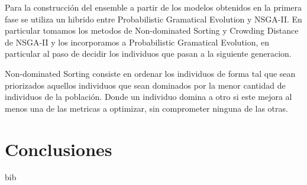 \documentclass[runningheads,a4paper]{llncs}
\begin{document}
	Para la construcción del ensemble a partir de los modelos obtenidos en la primera fase se utiliza un
	hibrido entre Probabilistic Gramatical Evolution y NSGA-II. En particular tomamos los metodos de
	Non-dominated Sorting y Crowding Distance de NSGA-II y los incorporamos a Probabilistic Gramatical
	Evolution, en particular al paso de decidir los individuos que pasan a la siguiente generacion.
	
	Non-dominated Sorting consiste en ordenar los individuos de forma tal que sean priorizados aquellos
	individuos que sean dominados por la menor cantidad de individuos de la población. Donde un individuo
	domina a otro si este mejora al menos una de las metricas a optimizar, sin comprometer ninguna de las
	otras.
	
	\section*{Conclusiones}
	
	
	\begin{thebibliography}{4}
		
		 bib
		
	\end{thebibliography}
	
	
\end{document}
